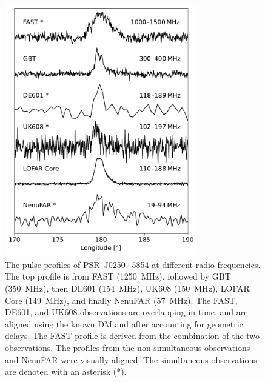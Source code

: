 \begin{figure}
    \begin{center}
    \includegraphics[width=0.75\textwidth]{Figures/J0250/profiles.pdf}
    \caption[Multi-frequency profiles of PSR~J0250+5854]{ The pulse profiles of PSR~J0250+5854 at different radio frequencies. The top profile is from FAST (1250~MHz), followed by GBT (350~MHz), then DE601 (154~MHz), UK608 (150~MHz), LOFAR Core (149~MHz), and finally NenuFAR (57~MHz). The FAST, DE601, and UK608 observations are overlapping in time, and are aligned using the known DM and after accounting for geometric delays. The FAST profile is derived from the combination of the two observations. The profiles from the non-simultaneous observations and NenuFAR were visually aligned. The simultaneous observations are denoted with an asterisk (*).}
    \label{fig: J0250 - profiles}
    \end{center}
\end{figure}

